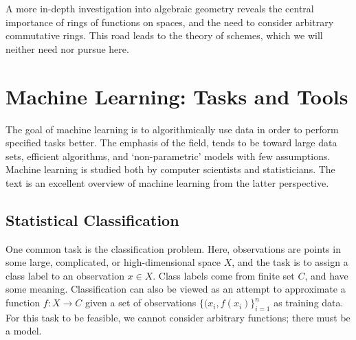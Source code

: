 \documentclass[11pt,titlepage]{article}
\numberwithin{equation}{section}
\begin{document}
    A more in-depth investigation into algebraic geometry reveals the central
    importance of rings of functions on spaces, and the need to consider
    arbitrary commutative rings.  This road leads to the theory of schemes,
    which we will neither need nor pursue here.

\section{Machine Learning: Tasks and Tools}
    \label{sec:ML}

    The goal of machine learning is to algorithmically use data in order to
    perform specified tasks better.  The emphasis of the field, tends to be
    toward large data sets, efficient algorithms, and `non-parametric' models
    with few assumptions.  Machine learning is studied both by computer
    scientists and statisticians.  The text \cite{EOSL} is an excellent overview
    of machine learning from the latter perspective.

\subsection{Statistical Classification}

    One common task is the classification problem.  Here, observations are
    points in some large, complicated, or high-dimensional space $X$, and the
    task is to assign a class label to an observation $x \in X$.  Class labels
    come from finite set $C$, and have some meaning.  Classification can also be
    viewed as an attempt to approximate a function $f : X \to C$ given a set of
    observations $\{(x_i, f(x_i)\}_{i=1}^n$ as training data.  For this task to
    be feasible, we cannot consider arbitrary functions; there must be a model.
\end{document}
